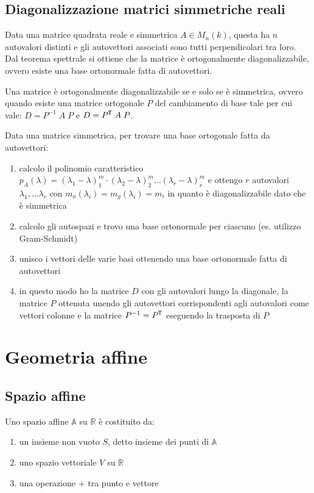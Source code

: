 \documentclass[a4paper]{article}
\newcommand\tran{^{\mkern-1.5mu\mathsf{T}}} %
\begin{document}
\newpage

\subsection{Diagonalizzazione matrici simmetriche reali}
Data una matrice quadrata reale e simmetrica \(A \in M_n(k)\), questa ha \(n\) autovalori distinti e gli autovettori associati sono
tutti perpendicolari tra loro. Dal teorema spettrale si ottiene che la matrice è ortogonalmente diagonalizzabile, ovvero esiste una
base ortonormale fatta di autovettori.

Una matrice è ortogonalmente diagonalizzabile se e solo se è simmetrica, ovvero quando esiste una matrice ortogonale \(P\) del
cambiamento di base tale per cui vale: \(D = P^{-1} \; A \; P\) e \(D = P\tran \; A \; P\).

Data una matrice simmetrica, per trovare una base ortogonale fatta da autovettori:
\begin{enumerate}[topsep=3pt, itemsep=0pt]
	\item calcolo il polinomio caratteristico \(p_A(\lambda) = (\lambda_1 - \lambda)^m_1 \cdot (\lambda_2 - \lambda)^m_2 \dots (\lambda_r - \lambda)^m_r\)
	e ottengo \(r\) autovalori \(\lambda_1, \dots \lambda_r\) con \(m_a(\lambda_i) = m_g(\lambda_i) = m_i\) in quanto è diagonalizzabile
	dato che è simmetrica
	\item calcolo gli autospazi e trovo una base ortonormale per ciascuno (es. utilizzo Gram-Schmidt)
	\item unisco i vettori delle varie basi ottenendo una base ortonormale fatta di autovettori
	\item[] in questo modo ho la matrice \(D\) con gli autovalori lungo la diagonale, la matrice \(P\) ottenuta unendo gli autovettori
	corrispondenti agli autovalori come vettori colonne e la matrice \(P^{-1} = P \tran\) eseguendo la trasposta di \(P\)
\end{enumerate}

\newpage

\section{Geometria affine}
\subsection{Spazio affine}
Uno spazio affine \(\mathbb{A}\) su \(\mathbb{R}\) è costituito da:
\begin{enumerate}[topsep=3pt, itemsep=0pt]
	\item un insieme non vuoto \(S\), detto insieme dei punti di \(\mathbb{A}\)
	\item uno spazio vettoriale \(V\) su \(\mathbb{R}\)
	\item una operazione \(+\) tra punto e vettore
\end{enumerate}
\end{document}
